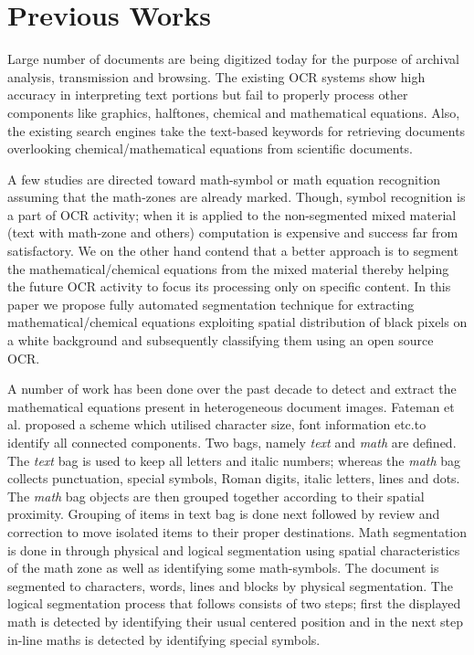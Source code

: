 \documentclass[oneside,a4paper,12pt]{book}
\begin{document}

\section{Previous Works}
\label{sec:prevwork}
  Large number of documents are being digitized today for the purpose of archival analysis, transmission and browsing. 
  The existing OCR systems show high accuracy in interpreting text portions but fail to properly process other
  components like graphics, halftones, chemical and mathematical  equations.
  Also, the existing search engines take the text-based keywords for retrieving documents overlooking chemical/mathematical
  equations from scientific documents.
  
  A few studies \cite{blostein_97, chan_2000, Garain_07} are directed toward math-symbol or math equation recognition 
  assuming that the math-zones are already marked. Though, symbol recognition is a part of OCR activity; when it is applied to
  the non-segmented mixed material (text with math-zone and others) computation is expensive and success far from satisfactory.
  We on the other hand contend that a better approach is to segment the mathematical/chemical equations from the mixed material
  thereby helping the future OCR activity to focus its processing only on specific content.
  In this paper we propose fully automated segmentation technique for extracting
  mathematical/chemical equations  exploiting spatial distribution of black pixels on a white background and subsequently
  classifying them using an open source OCR.
  
  A number of work has been done over the past decade to detect and extract the mathematical equations present in heterogeneous document images. 
  Fateman et al. \cite{fateman_96} proposed a scheme which utilised character size, font information etc.\@ to identify all connected components. Two bags, namely {\em text}
  and {\em math} are defined. The {\em text }bag is used to  keep   all letters and italic numbers;
  whereas the {\em  math} bag collects punctuation, special symbols, Roman digits, italic letters, lines and dots. The
 {\em math} bag objects are then grouped together according to their spatial proximity. Grouping of items in text bag is
  done next followed by review and correction to move isolated items to their proper destinations.
  Math segmentation is done in \cite{toumit_99} through physical and logical segmentation using spatial characteristics of the math zone as well
  as identifying some math-symbols. The document is segmented to characters, words, lines and blocks by physical segmentation. The logical segmentation process that follows consists of two steps;
  first the displayed math is detected by identifying their usual centered position and in the next step in-line maths is detected by identifying special symbols. 
 
\end{document}
